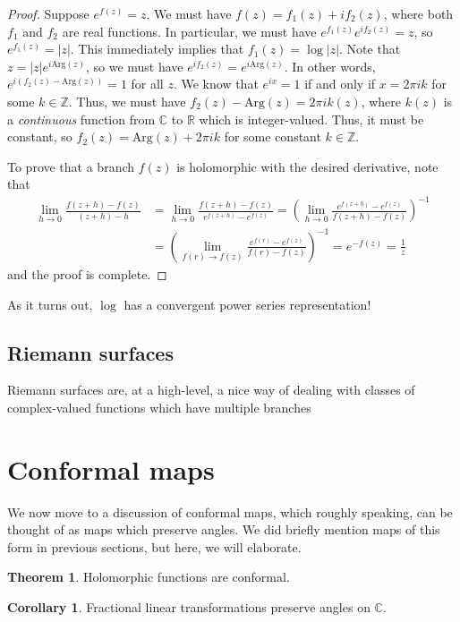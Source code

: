 \documentclass[aps,pra,showpacs,notitlepage,onecolumn,superscriptaddress,nofootinbib]{revtex4-1}
\theoremstyle{definition}
\newtheorem{theorem}{Theorem}[section]
\newtheorem{corollary}{Corollary}[theorem]
\begin{document}
\begin{proof}
  Suppose $e^{f(z)} = z$. We must have $f(z) = f_1(z) + i f_2(z)$, where both $f_1$ and $f_2$ are real functions. In particular, we must have $e^{f_1(z)} e^{i f_2(z)} = z$, so $e^{f_1(z)} = |z|$.
  This immediately implies that $f_1(z) = \log |z|$. Note that $z = |z| e^{i \text{Arg}(z)}$, so we must have $e^{i f_2(z)} = e^{i \text{Arg}(z)}$. In other words, $e^{i (f_2(z) - \text{Arg}(z))} = 1$
  for all $z$. We know that $e^{i x} = 1$ if and only if $x = 2\pi i k$ for some $k \in \mathbb{Z}$. Thus, we must have $f_2(z) - \text{Arg}(z) = 2\pi i k(z)$, where $k(z)$ is a \emph{continuous}
  function from $\mathbb{C}$ to $\mathbb{R}$ which is integer-valued. Thus, it must be constant, so $f_2(z) = \text{Arg}(z) + 2\pi i k$ for some constant $k \in \mathbb{Z}$.

  To prove that a branch $f(z)$ is holomorphic with the desired derivative, note that
  \begin{align}
    \lim_{h \to 0} \frac{f(z + h) - f(z)}{(z + h) - h} &= \lim_{h \to 0} \frac{f(z + h) - f(z)}{e^{f(z + h)} - e^{f(z)}} = \left( \lim_{h \to 0} \frac{e^{f(z + h)} - e^{f(z)}}{f(z + h) - f(z)} \right)^{-1}
    \\ & = \left( \lim_{f(r) \rightarrow f(z)} \frac{e^{f(r)} - e^{f(z)}}{f(r) - f(z)} \right)^{-1} = e^{-f(z)} = \frac{1}{z}
  \end{align}
  and the proof is complete.
\end{proof}

\noindent As it turns out, $\log$ has a convergent power series representation!

\subsection{Riemann surfaces}

\noindent Riemann surfaces are, at a high-level, a nice way of dealing with classes of complex-valued functions which have multiple branches

\section{Conformal maps}

\noindent We now move to a discussion of conformal maps, which roughly speaking, can be thought of as maps which preserve angles. We did briefly mention maps
of this form in previous sections, but here, we will elaborate.

\begin{theorem}
  Holomorphic functions are conformal.
\end{theorem}

\begin{corollary}
  Fractional linear transformations preserve angles on $\mathbb{C}$.
  \end{corollary}

\noindent 
\end{document}
